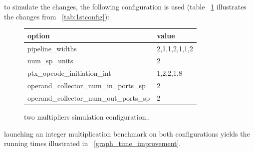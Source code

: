 \documentclass{report}
\begin{document}
    to simulate the changes, the following configuration is used (table ~\ref{tab:2ndconfig}
    illustrates the changes from ~\ref{tab:1stconfig}):
    \begin{figure}[h]
    \centering
        \begin{tabular}{ | l | l | }
    	    \hline
    	    option & value \\ \hline
    	    pipeline\_widths & 2,1,1,2,1,1,2 \\
            num\_sp\_units & 2 \\
            ptx\_opcode\_initiation\_int & 1,2,2,1,8 \\
            operand\_collector\_num\_in\_ports\_sp & 2 \\
            operand\_collector\_num\_out\_ports\_sp & 2 \\ \hline
  	    \end{tabular}
  	\captionsetup{justification=centering}
  	\caption{two multipliers simulation configuration..}
  	\label{tab:2ndconfig}
    \end{figure}

    launching an integer multiplication benchmark on both configurations yields the running
    times illustrated in ~\ref{graph_time_improvement}. 
\end{document}
